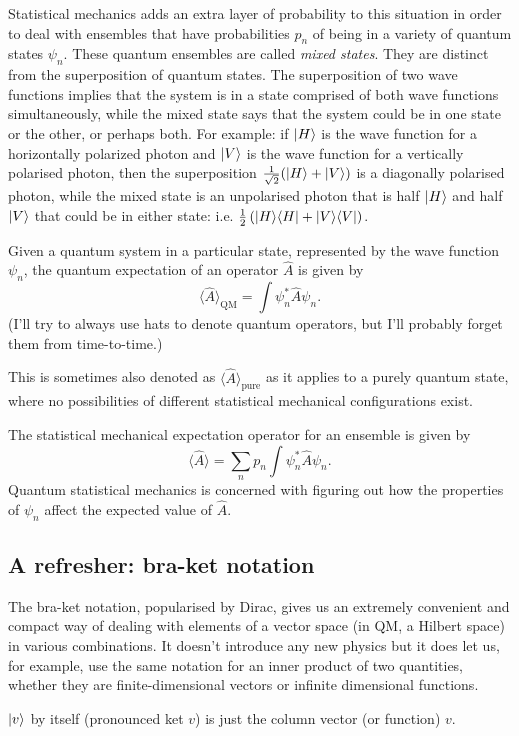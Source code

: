 \documentclass{article}
\begin{document}
Statistical mechanics adds an extra layer of probability to this situation in order to deal with ensembles that have probabilities $p_n$ of being in a variety of quantum states $\psi_n$. These quantum ensembles are called \emph{mixed states}. They are distinct from the superposition of quantum states. The superposition of two wave functions implies that the system is in a state comprised of both wave functions simultaneously, while the mixed state says that the system could be in one state or the other, or perhaps both. For example: if $| H \rangle$
is the wave function for a horizontally polarized photon and $| V \rangle$ is the wave function for a vertically polarised photon, then the superposition $\frac{1}{\sqrt{2}}(| H \rangle+| V \rangle)$ is a diagonally polarised photon, while the mixed state is an unpolarised photon that is half $| H \rangle$ and half $| V \rangle$ that could be in either state:  i.e. $\frac12\left(| H \rangle\langle H |+| V \rangle\langle V |\right)$.

Given a quantum system in a particular state, represented by the wave function $\psi_n$, the quantum expectation of an operator $\hat{A}$ is given by
$$
	\langle\hat{A}\rangle_\text{QM} = \int\psi^*_n\hat{A}\psi_n.
$$
(I'll try to always use hats to denote quantum operators, but I'll probably forget them from time-to-time.)

This is sometimes also denoted as $\langle\hat{A}\rangle_\text{pure}$ as it applies to a purely quantum state, where no possibilities of different statistical mechanical configurations exist.

The statistical mechanical expectation operator for an ensemble is given by
$$
		\langle\hat{A}\rangle = \sum_n p_n\int\psi_n^*\hat{A}\psi_n.
$$
Quantum statistical mechanics is concerned with figuring out how the properties of $\psi_n$ affect the expected value of $\hat{A}$.

\subsection{A refresher: bra-ket notation}
The bra-ket notation, popularised by Dirac, gives us an extremely convenient and compact way of dealing with elements of a vector space (in QM, a Hilbert space) in various combinations. It doesn't introduce any new physics but it does let us, for example, use the same notation for an inner product of two quantities, whether they are finite-dimensional vectors or infinite dimensional functions.

$| v \rangle$ by itself (pronounced ket $v$) is just the column vector (or function) $v$.
\end{document}
